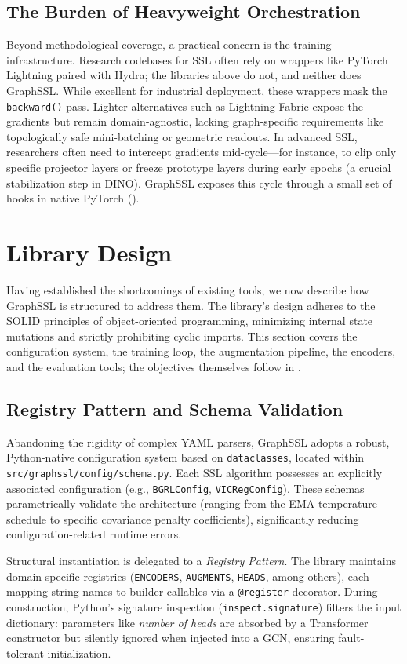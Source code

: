 \documentclass[conference]{IEEEtran}
\begin{document}
\subsection{The Burden of Heavyweight Orchestration}
Beyond methodological coverage, a practical concern is the training infrastructure. Research codebases for SSL often rely on wrappers like PyTorch Lightning paired with Hydra; the libraries above do not, and neither does GraphSSL. While excellent for industrial deployment, these wrappers mask the \texttt{backward()} pass. Lighter alternatives such as Lightning Fabric expose the gradients but remain domain-agnostic, lacking graph-specific requirements like topologically safe mini-batching or geometric readouts. In advanced SSL, researchers often need to intercept gradients mid-cycle---for instance, to clip only specific projector layers or freeze prototype layers during early epochs (a crucial stabilization step in DINO). GraphSSL exposes this cycle through a small set of hooks in native PyTorch ().

\section{Library Design}
\label{sec:design}
Having established the shortcomings of existing tools, we now describe how GraphSSL is structured to address them. The library's design adheres to the SOLID principles of object-oriented programming, minimizing internal state mutations and strictly prohibiting cyclic imports. This section covers the configuration system, the training loop, the augmentation pipeline, the encoders, and the evaluation tools; the objectives themselves follow in .

\subsection{Registry Pattern and Schema Validation}
Abandoning the rigidity of complex YAML parsers, GraphSSL adopts a robust, Python-native configuration system based on \texttt{dataclasses}, located within \texttt{src/graphssl/config/schema.py}. Each SSL algorithm possesses an explicitly associated configuration (e.g., \texttt{BGRLConfig}, \texttt{VICRegConfig}). These schemas parametrically validate the architecture (ranging from the EMA temperature schedule to specific covariance penalty coefficients), significantly reducing configuration-related runtime errors.

Structural instantiation is delegated to a \textit{Registry Pattern}. The library maintains domain-specific registries (\texttt{ENCODERS}, \texttt{AUGMENTS}, \texttt{HEADS}, among others), each mapping string names to builder callables via a \texttt{@register} decorator. During construction, Python's signature inspection (\texttt{inspect.signature}) filters the input dictionary: parameters like \textit{number of heads} are absorbed by a Transformer constructor but silently ignored when injected into a GCN, ensuring fault-tolerant initialization.
\end{document}
